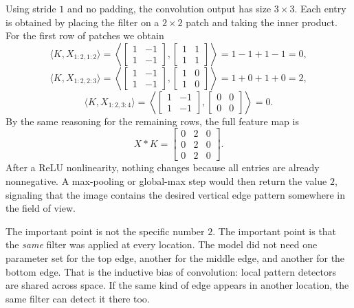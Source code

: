 Using stride $1$ and no padding, the convolution output has size $3 \times 3$.
Each entry is obtained by placing the filter on a $2 \times 2$ patch and taking the inner product.
For the first row of patches we obtain
\[
\langle K, X_{1:2,1:2}\rangle
=
\left\langle
\begin{bmatrix}1 & -1\\ 1 & -1\end{bmatrix},
\begin{bmatrix}1 & 1\\ 1 & 1\end{bmatrix}
\right\rangle
=1-1+1-1=0,
\]
\[
\langle K, X_{1:2,2:3}\rangle
=
\left\langle
\begin{bmatrix}1 & -1\\ 1 & -1\end{bmatrix},
\begin{bmatrix}1 & 0\\ 1 & 0\end{bmatrix}
\right\rangle
=1+0+1+0=2,
\]
\[
\langle K, X_{1:2,3:4}\rangle
=
\left\langle
\begin{bmatrix}1 & -1\\ 1 & -1\end{bmatrix},
\begin{bmatrix}0 & 0\\ 0 & 0\end{bmatrix}
\right\rangle
=0.
\]
By the same reasoning for the remaining rows, the full feature map is
\[
X * K=
\begin{bmatrix}
0 & 2 & 0\\
0 & 2 & 0\\
0 & 2 & 0
\end{bmatrix}.
\]
After a ReLU nonlinearity, nothing changes because all entries are already nonnegative.
A max-pooling or global-max step would then return the value $2$, signaling that the image contains the desired vertical edge pattern somewhere in the field of view.

\begin{example}
The important point is not the specific number $2$.
The important point is that the \emph{same} filter was applied at every location.
The model did not need one parameter set for the top edge, another for the middle edge, and another for the bottom edge.
That is the inductive bias of convolution: local pattern detectors are shared across space.
If the same kind of edge appears in another location, the same filter can detect it there too.
\end{example}

